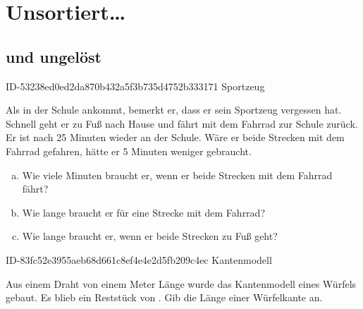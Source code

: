 \allowdisplaybreaks
\setcounter{chapter}{-1}
\chapter{Unsortiert\ldots}

\section{und ungelöst}

\begin{exercise}
      {ID-53238ed0ed2da870b432a5f3b735d4752b333171}
      {Sportzeug}
  \ifproblem\problem\par
    Als \xyc{} in der Schule ankommt, bemerkt er,
    dass er sein Sportzeug vergessen hat. Schnell
    geht er zu Fuß nach Hause und fährt mit dem
    Fahrrad zur Schule zurück. Er ist nach
    \num{25} Minuten wieder an der Schule.
    Wäre er beide Strecken mit dem Fahrrad gefahren,
    hätte er \num{5} Minuten weniger gebraucht.
    \begin{enumerate}[a)]
      \item Wie viele Minuten braucht er, wenn er
            beide Strecken mit dem Fahrrad fährt?
      \item Wie lange braucht er für eine Strecke
            mit dem Fahrrad?
      \item Wie lange braucht er, wenn er beide
            Strecken zu Fuß geht?
    \end{enumerate}
  \fi
\end{exercise}

\begin{exercise}
      {ID-83fc52e3955aeb68d661c8ef4e4e2d5fb209c4ec}
      {Kantenmodell}
  \ifproblem\problem\par
    Aus einem Draht von einem Meter Länge wurde das
    Kantenmodell eines Würfels gebaut. Es blieb ein
    Reststück von . Gib die Länge einer
    Würfelkante an.
  \fi
\end{exercise}

